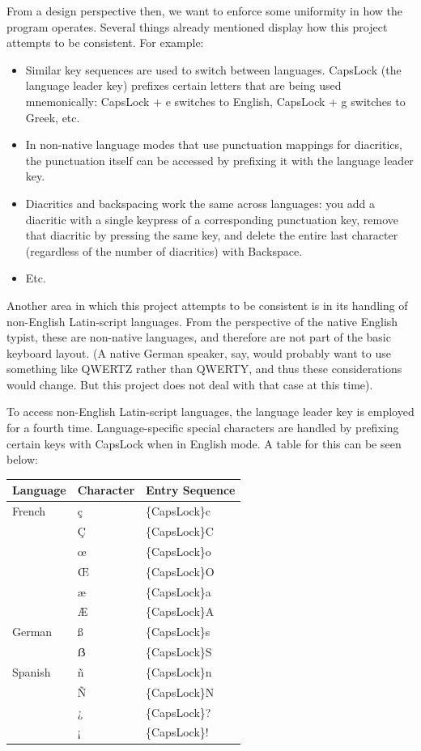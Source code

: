 \documentclass[11pt]{article}
\begin{document}
From a design perspective then, we want to enforce some uniformity in how the program operates. Several things already mentioned display how this project attempts to be consistent. For example:

\begin{itemize}
\item Similar key sequences are used to switch between languages. CapsLock (the language leader key) prefixes certain letters that are being used mnemonically: CapsLock + e switches to English, CapsLock + g switches to Greek, etc.
\item In non-native language modes that use punctuation mappings for diacritics, the punctuation itself can be accessed by prefixing it with the language leader key.
\item Diacritics and backspacing work the same across languages: you add a diacritic with a single keypress of a corresponding punctuation key, remove that diacritic by pressing the same key, and delete the entire last character (regardless of the number of diacritics) with Backspace.
\item Etc.
\end{itemize}

Another area in which this project attempts to be consistent is in its handling of non-English Latin-script languages. From the perspective of the native English typist, these are non-native languages, and therefore are not part of the basic keyboard layout. (A native German speaker, say, would probably want to use something like QWERTZ rather than QWERTY, and thus these considerations would change. But this project does not deal with that case at this time).

To access non-English Latin-script languages, the language leader key is employed for a fourth time. Language-specific special characters are handled by prefixing certain keys with CapsLock when in English mode. A table for this can be seen below:

\begin{center}
\begin{tabular}{lll}
Language & Character & Entry Sequence\\
\hline
French & ç & \{CapsLock\}c\\
 & Ç & \{CapsLock\}C\\
 & œ & \{CapsLock\}o\\
 & Œ & \{CapsLock\}O\\
 & æ & \{CapsLock\}a\\
 & Æ & \{CapsLock\}A\\
German & ß & \{CapsLock\}s\\
 & ẞ & \{CapsLock\}S\\
Spanish & ñ & \{CapsLock\}n\\
 & Ñ & \{CapsLock\}N\\
 & ¿ & \{CapsLock\}?\\
 & ¡ & \{CapsLock\}!\\
\end{tabular}
\end{center}
\end{document}
